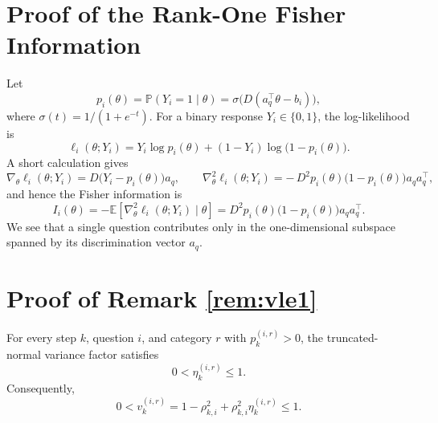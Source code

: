 \documentclass{article}
\begin{document}
\section{Proof of the Rank-One Fisher Information}\label{appendix:fisher}
Let
\begin{equation*}
p_i(\theta)
=
\mathbb P(Y_i=1\mid \theta)
=
\sigma\!\bigl(D(a_q^\top\theta-b_i)\bigr),
\end{equation*}
where $\sigma(t)=1/(1+e^{-t})$. For a binary response
$Y_i\in\{0,1\}$, the log-likelihood is
\begin{equation*}
\ell_i(\theta;Y_i)
=
Y_i\log p_i(\theta)
+
(1-Y_i)\log\bigl(1-p_i(\theta)\bigr).
\end{equation*}
A short calculation gives
\begin{equation*}
\nabla_\theta \ell_i(\theta;Y_i)
=
D\bigl(Y_i-p_i(\theta)\bigr)a_q,
\qquad
\nabla_\theta^2 \ell_i(\theta;Y_i)
=
-\,D^2p_i(\theta)\bigl(1-p_i(\theta)\bigr)a_q a_q^\top,
\end{equation*}
and hence the Fisher information is
\begin{equation*}
I_i(\theta)
=
-\mathbb E\!\left[\nabla_\theta^2\ell_i(\theta;Y_i)\mid \theta\right]
=
D^2p_i(\theta)\bigl(1-p_i(\theta)\bigr)a_q a_q^\top.
\end{equation*}
We see that a single question
contributes only in the one-dimensional subspace spanned by its
discrimination vector $a_q$.
\newpage
\section{Proof of Remark \ref{rem:vle1}}\label{appendix:truncated_variance_bound}
\begin{lemma}
\label{lem:eta_bound}
For every step $k$, question $i$, and category $r$ with $p_k^{(i,r)}>0$, the truncated-normal
variance factor satisfies
\begin{equation*}
0<\eta_k^{(i,r)}\le 1.
\end{equation*}
Consequently,
\begin{equation*}
0<v_k^{(i,r)}
=
1-\rho_{k,i}^2+\rho_{k,i}^2\eta_k^{(i,r)}
\le 1.
\end{equation*}
\end{lemma}
\end{document}
